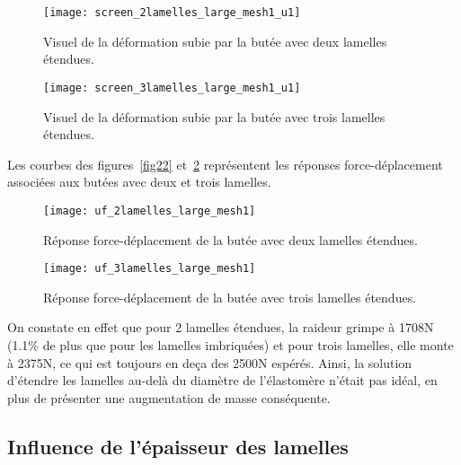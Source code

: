 ﻿ \documentclass{article}
\begin{document}
\begin{figure}[htbp]
	\begin{minipage}[c]{.45\linewidth}
	\begin{center}
	\texttt{[image: screen\_2lamelles\_large\_mesh1\_u1]}
	\caption{Visuel de la déformation subie par la butée avec deux lamelles étendues.}
	\label{fig20}
	\end{center}
	\end{minipage}
	\hfill
	\begin{minipage}[c]{.45\linewidth}
	\begin{center}
	\texttt{[image: screen\_3lamelles\_large\_mesh1\_u1]}
	\caption{Visuel de la déformation subie par la butée avec trois lamelles étendues.}
	\label{fig21}
	\end{center}
	\end{minipage}
\end{figure}

Les courbes des figures~\ref{fig22} et~\ref{fig23} représentent les réponses force-déplacement associées aux butées avec deux et trois lamelles.

\begin{figure}[htbp]
	\begin{minipage}[c]{.45\linewidth}
	\begin{center}
	\texttt{[image: uf\_2lamelles\_large\_mesh1]}
	\caption{Réponse force-déplacement de la butée avec deux lamelles étendues.}
	\label{fig22}
	\end{center}
	\end{minipage}
	\hfill
	\begin{minipage}[c]{.45\linewidth}
	\begin{center}
	\texttt{[image: uf\_3lamelles\_large\_mesh1]}
	\caption{Réponse force-déplacement de la butée avec trois lamelles étendues.}
	\label{fig23}
	\end{center}
	\end{minipage}
\end{figure}

On constate en effet que pour 2 lamelles étendues, la raideur grimpe à 1708N (1.1\% de plus que pour les lamelles imbriquées) et pour trois lamelles, elle monte à 2375N, ce qui est toujours en deça des 2500N espérés. Ainsi, la solution d'étendre les lamelles au-delà du diamètre de l'élastomère n'était pas idéal, en plus de présenter une augmentation de masse conséquente.

\subsection{Influence de l'épaisseur des lamelles}
\end{document}
